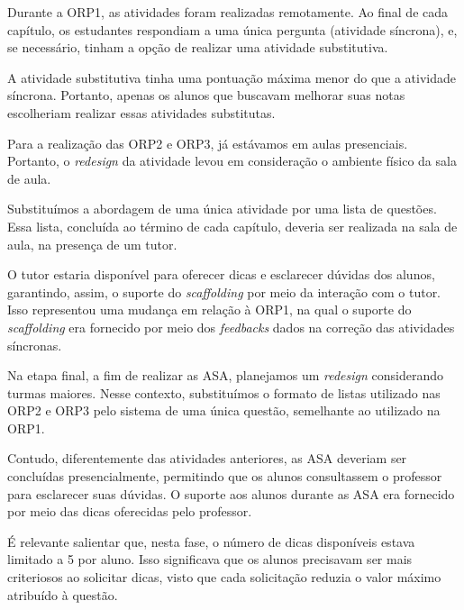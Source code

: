 Durante a ORP1, as atividades foram realizadas remotamente. Ao final de cada capítulo, os estudantes respondiam a uma única pergunta (atividade síncrona), e, se necessário, tinham a opção de realizar uma atividade substitutiva.

A atividade substitutiva tinha uma pontuação máxima menor do que a atividade síncrona. Portanto, apenas os alunos que buscavam melhorar suas notas escolheriam realizar essas atividades substitutas.

Para a realização das ORP2 e ORP3, já estávamos em aulas presenciais. Portanto, o \textit{redesign} da atividade levou em consideração o ambiente físico da sala de aula.

Substituímos a abordagem de uma única atividade por uma lista de questões. Essa lista, concluída ao término de cada capítulo, deveria ser realizada na sala de aula, na presença de um tutor.

O tutor estaria disponível para oferecer dicas e esclarecer dúvidas dos alunos, garantindo, assim, o suporte do \textit{scaffolding} por meio da interação com o tutor. Isso representou uma mudança em relação à ORP1, na qual o suporte do \textit{scaffolding} era fornecido por meio dos \textit{feedbacks} dados na correção das atividades síncronas.

Na etapa final, a fim de realizar as ASA, planejamos um \textit{redesign} considerando turmas maiores. Nesse contexto, substituímos o formato de listas utilizado nas ORP2 e ORP3 pelo sistema de uma única questão, semelhante ao utilizado na ORP1.

Contudo, diferentemente das atividades anteriores, as ASA deveriam ser concluídas presencialmente, permitindo que os alunos consultassem o professor para esclarecer suas dúvidas. O suporte aos alunos durante as ASA era fornecido por meio das dicas oferecidas pelo professor.

É relevante salientar que, nesta fase, o número de dicas disponíveis estava limitado a 5 por aluno. Isso significava que os alunos precisavam ser mais criteriosos ao solicitar dicas, visto que cada solicitação reduzia o valor máximo atribuído à questão.